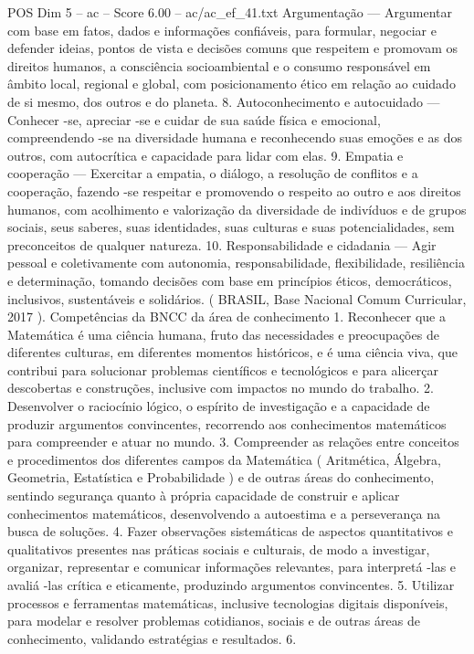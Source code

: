 \begin{textsample}{POS Dim 5 – ac – Score 6.00 – ac/ac\_ef\_41.txt}
Argumentação — Argumentar com base em fatos, dados e informações confiáveis, para formular, negociar e defender ideias, pontos de vista e decisões comuns que respeitem e promovam os direitos humanos, a consciência socioambiental e o consumo responsável em âmbito local, regional e global, com posicionamento ético em relação ao cuidado de si mesmo, dos outros e do planeta. 8.
Autoconhecimento e autocuidado — Conhecer -se, apreciar -se e cuidar de sua saúde física e emocional, compreendendo -se na diversidade humana e reconhecendo suas emoções e as dos outros, com autocrítica e capacidade para lidar com elas. 9.
Empatia e cooperação — Exercitar a empatia, o diálogo, a resolução de conflitos e a cooperação, fazendo -se respeitar e promovendo o respeito ao outro e aos direitos humanos, com acolhimento e valorização da diversidade de indivíduos e de grupos sociais, seus saberes, suas identidades, suas culturas e suas potencialidades, sem preconceitos de qualquer natureza. 10.
Responsabilidade e cidadania — Agir pessoal e coletivamente com autonomia, responsabilidade, flexibilidade, resiliência e determinação, tomando decisões com base em princípios éticos, democráticos, inclusivos, sustentáveis e solidários. ( BRASIL, Base Nacional Comum Curricular, 2017 ).
Competências da BNCC da área de conhecimento 1.
Reconhecer que a Matemática é uma ciência humana, fruto das necessidades e preocupações de diferentes culturas, em diferentes momentos históricos, e é uma ciência viva, que contribui para solucionar problemas científicos e tecnológicos e para alicerçar descobertas e construções, inclusive com impactos no mundo do trabalho. 2.
Desenvolver o raciocínio lógico, o espírito de investigação e a capacidade de produzir argumentos convincentes, recorrendo aos conhecimentos matemáticos para compreender e atuar no mundo. 3.
Compreender as relações entre conceitos e procedimentos dos diferentes campos da Matemática ( Aritmética, Álgebra, Geometria, Estatística e Probabilidade ) e de outras áreas do conhecimento, sentindo segurança quanto à própria capacidade de construir e aplicar conhecimentos matemáticos, desenvolvendo a autoestima e a perseverança na busca de soluções. 4.
Fazer observações sistemáticas de aspectos quantitativos e qualitativos presentes nas práticas sociais e culturais, de modo a investigar, organizar, representar e comunicar informações relevantes, para interpretá -las e avaliá -las crítica e eticamente, produzindo argumentos convincentes. 5.
Utilizar processos e ferramentas matemáticas, inclusive tecnologias digitais disponíveis, para modelar e resolver problemas cotidianos, sociais e de outras áreas de conhecimento, validando estratégias e resultados. 6.

\end{textsample}
